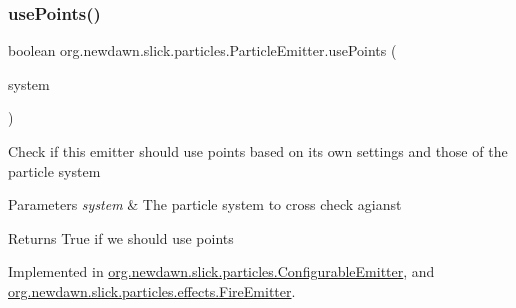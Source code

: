 \mbox{\label{interfaceorg_1_1newdawn_1_1slick_1_1particles_1_1_particle_emitter_a26ad157d83aebf2e49163ddaae6a9edd}} 
\subsubsection{\texorpdfstring{use\+Points()}{usePoints()}}
{\footnotesize\ttfamily boolean org.\+newdawn.\+slick.\+particles.\+Particle\+Emitter.\+use\+Points (\begin{DoxyParamCaption}\item[{\mbox{\hyperlink{classorg_1_1newdawn_1_1slick_1_1particles_1_1_particle_system}{Particle\+System}}}]{system }\end{DoxyParamCaption})}

Check if this emitter should use points based on it\textquotesingle{}s own settings and those of the particle system


\begin{DoxyParams}{Parameters}
{\em system} & The particle system to cross check agianst \\
\hline
\end{DoxyParams}
\begin{DoxyReturn}{Returns}
True if we should use points 
\end{DoxyReturn}


Implemented in \mbox{\hyperlink{classorg_1_1newdawn_1_1slick_1_1particles_1_1_configurable_emitter_a8034277f8d85d47a5460665c5212d351}{org.\+newdawn.\+slick.\+particles.\+Configurable\+Emitter}}, and \mbox{\hyperlink{classorg_1_1newdawn_1_1slick_1_1particles_1_1effects_1_1_fire_emitter_ab1eb7609b370a6a8cffbb5b7e1bd6cb3}{org.\+newdawn.\+slick.\+particles.\+effects.\+Fire\+Emitter}}.

\mbox{\label{interfaceorg_1_1newdawn_1_1slick_1_1particles_1_1_particle_emitter_ad8549755b39d63bdde71860be6b0f1f9}} 
